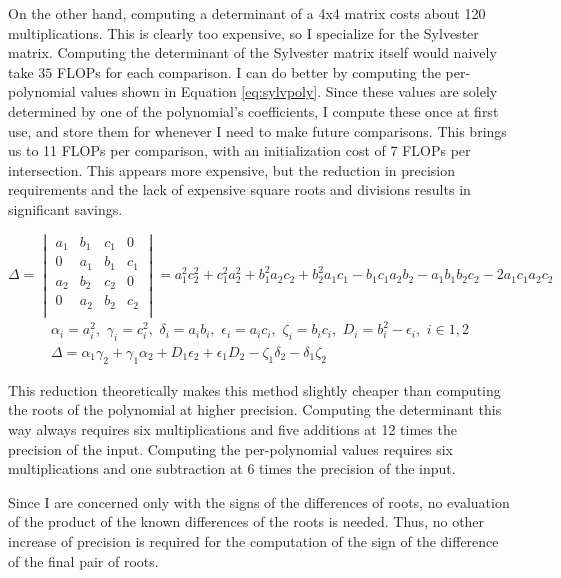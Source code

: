 \documentclass{cccg16}
\begin{document}
On the other hand, computing a determinant of a 4x4 matrix costs about
120 multiplications.  This is clearly too expensive, so I specialize
for the Sylvester matrix.  Computing the determinant of the Sylvester
matrix itself would naively take $35$ FLOPs for each comparison.  I
can do better by computing the per-polynomial values shown in Equation
\ref{eq:sylvpoly}.  Since these values are solely determined by one of
the polynomial's coefficients, I compute these once at first use, and
store them for whenever I need to make future comparisons.  This
brings us to 11 FLOPs per comparison, with an initialization cost of 7
FLOPs per intersection.  This appears more expensive, but the
reduction in precision requirements and the lack of expensive square
roots and divisions results in significant savings.
\begin{figure*}
  \begin{equation*}
    \Delta=\begin{vmatrix}
    a_1 & b_1 & c_1 & 0\\
    0 & a_1 & b_1 & c_1\\
    a_2 & b_2 & c_2 & 0\\
    0 & a_2 & b_2 & c_2\\
    \end{vmatrix}=
    a_1^2 c_2^2 + c_1^2 a_2^2 + b_1^2 a_2 c_2 + b_2^2 a_1 c_1 -
    b_1 c_1 a_2 b_2 - a_1 b_1 b_2 c_2 - 2 a_1 c_1 a_2 c_2
  \end{equation*}
  \begin{align}
    \alpha_i=a_i^2,\,\, \gamma_i=c_i^2,\,\,
    \delta_i=a_i b_i,\,\, \epsilon_i=a_i c_i,\,\, \zeta_i=b_i c_i,\,\,
    D_i=b_i^2-\epsilon_i,\,\,
    i\in {1, 2}\\
    \Delta = \alpha_1 \gamma_2 + \gamma_1 \alpha_2 +
    D_1 \epsilon_2 + \epsilon_1 D_2 - \zeta_1 \delta_2 -
    \delta_1 \zeta_2
  \label{eq:sylvpoly}
  \end{align}
\end{figure*}
This reduction theoretically makes this method slightly cheaper than
computing the roots of the polynomial at higher precision.  Computing
the determinant this way always requires six multiplications and five
additions at 12 times the precision of the input.  Computing the
per-polynomial values requires six multiplications and one subtraction
at 6 times the precision of the input.

Since I are concerned only with the signs of the differences of
roots, no evaluation of the product of the known differences of the
roots is needed.  Thus, no other increase of precision is required for
the computation of the sign of the difference of the final pair of
roots.
\end{document}
